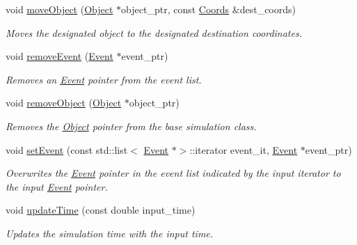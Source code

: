 \begin{DoxyCompactItemize}
void \hyperlink{class_simulation_a7b10f51640088366d0d1278361817e8d}{move\+Object} (\hyperlink{class_object}{Object} $\ast$object\+\_\+ptr, const \hyperlink{struct_coords}{Coords} \&dest\+\_\+coords)
\begin{DoxyCompactList}\small\item\em Moves the designated object to the designated destination coordinates. \end{DoxyCompactList}\item 
void \hyperlink{class_simulation_a3a4808231d4760f0ab30ea39b6a67e8c}{remove\+Event} (\hyperlink{class_event}{Event} $\ast$event\+\_\+ptr)
\begin{DoxyCompactList}\small\item\em Removes an \hyperlink{class_event}{Event} pointer from the event list. \end{DoxyCompactList}\item 
void \hyperlink{class_simulation_a39da17feb9b487c05c9a834def44972f}{remove\+Object} (\hyperlink{class_object}{Object} $\ast$object\+\_\+ptr)
\begin{DoxyCompactList}\small\item\em Removes the \hyperlink{class_object}{Object} pointer from the base simulation class. \end{DoxyCompactList}\item 
void \hyperlink{class_simulation_a4490fc0d8bb8a36b0ff581148ab85a14}{set\+Event} (const std\+::list$<$ \hyperlink{class_event}{Event} $\ast$$>$\+::iterator event\+\_\+it, \hyperlink{class_event}{Event} $\ast$event\+\_\+ptr)
\begin{DoxyCompactList}\small\item\em Overwrites the \hyperlink{class_event}{Event} pointer in the event list indicated by the input iterator to the input \hyperlink{class_event}{Event} pointer. \end{DoxyCompactList}\item 
void \hyperlink{class_simulation_a1affa7d0725c3d10663095619dcb9208}{update\+Time} (const double input\+\_\+time)
\begin{DoxyCompactList}\small\item\em Updates the simulation time with the input time. \end{DoxyCompactList}\end{DoxyCompactItemize}
